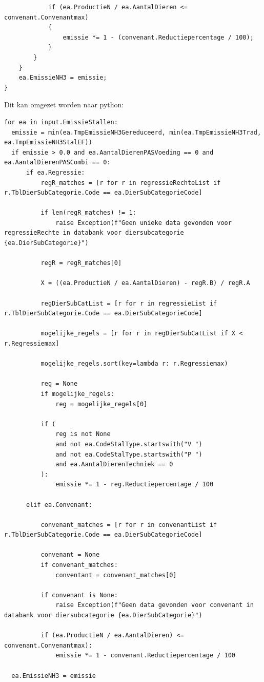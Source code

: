\begin{verbatim}
            if (ea.ProductieN / ea.AantalDieren <= convenant.Convenantmax)
            {
                emissie *= 1 - (convenant.Reductiepercentage / 100);
            }
        }
    }
    ea.EmissieNH3 = emissie;
}
\end{verbatim}

Dit kan omgezet worden naar python:
\begin{verbatim}
for ea in input.EmissieStallen:
  emissie = min(ea.TmpEmissieNH3Gereduceerd, min(ea.TmpEmissieNH3Trad, ea.TmpEmissieNH3StalEF))
  if emissie > 0.0 and ea.AantalDierenPASVoeding == 0 and ea.AantalDierenPASCombi == 0:
      if ea.Regressie:
          regR_matches = [r for r in regressieRechteList if r.TblDierSubCategorie.Code == ea.DierSubCategorieCode]

          if len(regR_matches) != 1:
              raise Exception(f"Geen unieke data gevonden voor regressieRechte in databank voor diersubcategorie {ea.DierSubCategorie}")

          regR = regR_matches[0]

          X = ((ea.ProductieN / ea.AantalDieren) - regR.B) / regR.A

          regDierSubCatList = [r for r in regressieList if r.TblDierSubCategorie.Code == ea.DierSubCategorieCode]

          mogelijke_regels = [r for r in regDierSubCatList if X < r.Regressiemax]

          mogelijke_regels.sort(key=lambda r: r.Regressiemax)
          
          reg = None
          if mogelijke_regels:
              reg = mogelijke_regels[0]

          if (
              reg is not None
              and not ea.CodeStalType.startswith("V ")
              and not ea.CodeStalType.startswith("P ")
              and ea.AantalDierenTechniek == 0
          ):
              emissie *= 1 - reg.Reductiepercentage / 100

      elif ea.Convenant:

          convenant_matches = [r for r in convenantList if r.TblDierSubCategorie.Code == ea.DierSubCategorieCode]

          convenant = None
          if convenant_matches:
              conventant = convenant_matches[0]

          if convenant is None:
              raise Exception(f"Geen data gevonden voor convenant in databank voor diersubcategorie {ea.DierSubCategorie}")

          if (ea.ProductieN / ea.AantalDieren) <= convenant.Convenantmax):
              emissie *= 1 - convenant.Reductiepercentage / 100

  ea.EmissieNH3 = emissie
\end{verbatim}

